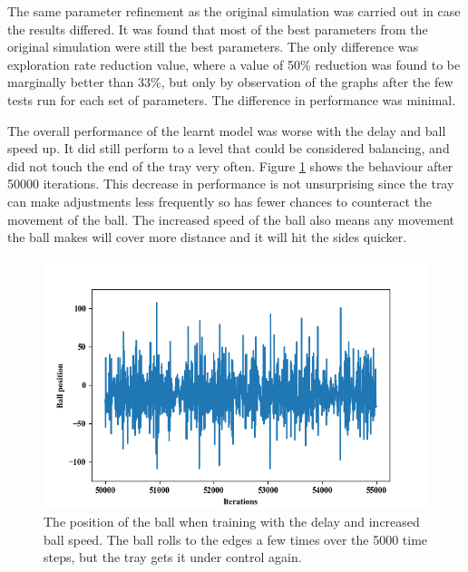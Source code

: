 \documentclass[12pt,a4paper]{article}
\begin{document}
The same parameter refinement as the original simulation was carried out in case the results differed. It was found that most of the best parameters from the original simulation were still the best parameters. The only difference was exploration rate reduction value, where a value of 50\% reduction was found to be marginally better than 33\%, but only by observation of the graphs after the few tests run for each set of parameters. The difference in performance was minimal.

The overall performance of the learnt model was worse with the delay and ball speed up. It did still perform to a level that could be considered balancing, and did not touch the end of the tray very often. Figure \ref{refined_sim_general} shows the behaviour after 50000 iterations. This decrease in performance is not unsurprising since the tray can make adjustments less frequently so has fewer chances to counteract the movement of the ball. The increased speed of the ball also means any movement the ball makes will cover more distance and it will hit the sides quicker.

\begin{figure}[H]
	\includegraphics{195}
	\caption{The position of the ball when training with the delay and increased ball speed. The ball rolls to the edges a few times over the 5000 time steps, but the tray gets it under control again. }
	\label{refined_sim_general}
\end{figure}
\end{document}
